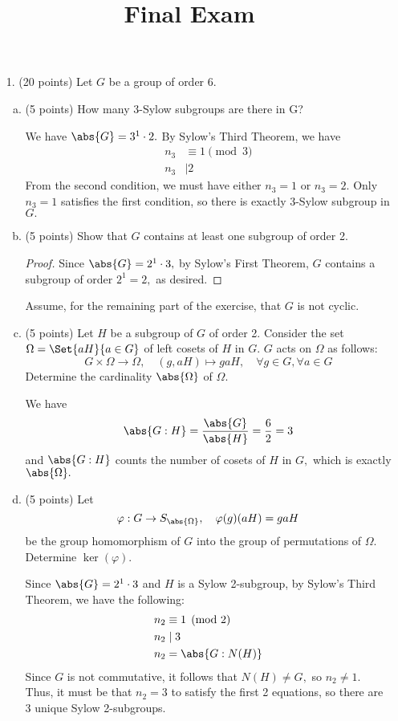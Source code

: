 \documentclass{article}
\begin{document}
\title{Final Exam}
\maketitle
\thispagestyle{fancy}

\newpage

\begin{itemize}
	\item[1.] (20 points) Let $G$ be a group of order 6.
		\begin{enumerate}[(a)]
			\item (5 points) How many 3-Sylow subgroups are there in G?
				\begin{soln}
					We have $\abs{G}=3^1\cdot 2.$ By Sylow's Third Theorem, we have
					\begin{align*}
						n_3 &\equiv 1\pmod 3 \\
						n_3 &\mid 2
					\end{align*}
					From the second condition, we must have either $n_3=1$ or $n_3=2.$ Only $n_3=1$ satisfies the first condition, so there is exactly  3-Sylow subgroup in $G.$	
				\end{soln}

			\item (5 points) Show that $G$ contains at least one subgroup of order 2.
				\begin{proof}
					Since $\abs{G}=2^1\cdot 3,$ by Sylow's First Theorem, $G$ contains a subgroup of order $2^1=2,$ as desired.
				\end{proof}

				Assume, for the remaining part of the exercise, that $G$ is not cyclic.

			\item (5 points) Let $H$ be a subgroup of $G$ of order 2. Consider the set $\Omega=\Set{aH}{a\in G}$ of left cosets of $H$ in $G.$ $G$ acts on $\Omega$ as follows:
				\[G\times \Omega\to \Omega, \quad (g, aH)\mapsto gaH, \quad \forall g\in G, \forall a\in G\]
				Determine the cardinality $\abs{\Omega}$ of $\Omega.$
				\begin{soln}
					We have 
					\[\abs{G:H}=\frac{\abs{G}}{\abs{H}}=\frac{6}{2}=3\]
					and $\abs{G:H}$ counts the number of cosets of $H$ in $G,$ which is exactly $\abs{\Omega}.$
				\end{soln}

			\item (5 points) Let
				\[\varphi:G\to S_{\abs{\Omega}}, \quad \varphi(g)(aH) = gaH\]
				be the group homomorphism of $G$ into the group of permutations of $\Omega.$ Determine $\ker(\varphi).$
				\begin{soln}
					Since $\abs{G}=2^1\cdot 3$ and $H$ is a Sylow 2-subgroup, by Sylow's Third Theorem, we have the following:
					\begin{align*}
						n_2 &\equiv 1\pmod 2 \\
						n_2 &\mid 3 \\
						n_2 &= \abs{G:N(H)}
					\end{align*}
					Since $G$ is not commutative, it follows that $N(H)\neq G,$ so $n_2\neq 1.$ Thus, it must be that $n_2=3$ to satisfy the first 2 equations, so there are 3 unique Sylow 2-subgroups.


\end{soln}
\end{enumerate}
\end{itemize}
\end{document}
